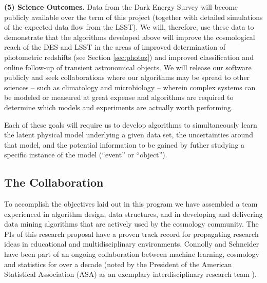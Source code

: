 \documentclass[useAMS,usenatbib,tightenlines,11pt,preprint]{aastex}
\begin{document}
{\bf (5) Science Outcomes.}  Data from the Dark Energy Survey will become
publicly available over the term of this project (together with
detailed simulations of the expected data flow from the LSST).  We
will, therefore, use these data to demonstrate
that the algorithms developed above will improve the cosmological
reach of the DES and LSST in the areas of  
improved determination of photometric
redshifts (see Section \ref{sec:photoz}) and improved classification and online
follow-up of transient astronomical objects.  We will release our software
publicly and seek collaborations where our algorithms may be spread to
other sciences -- such as climatology and microbiology -- wherein complex
systems can be modeled or measured at great expense and algorithms are
required to determine which models and experiments are actually worth
performing.

Each of these goals will require us to develop algorithms to simultaneously
learn the latent physical model underlying a given data set, the
uncertainties around that model, and the potential information to be gained
by futher studying a specific instance of the model (``event'' or
``object'').

\subsection{The Collaboration}

To accomplish the objectives laid out in this program we have
assembled a team experienced in algorithm design, data structures, and
in developing and delivering data mining algorithms that are actively
used by the cosmology community. The PIs of this research proposal
have a proven track record for propagating research ideas in
educational and multidisciplinary environments. Connolly and Schneider
have been part of an ongoing collaboration between machine learning,
cosmology and statistics for over a decade (noted by the President
of the American Statistical Association (ASA) as an exemplary
interdisciplinary research team \cite{straf03}).
\end{document}
